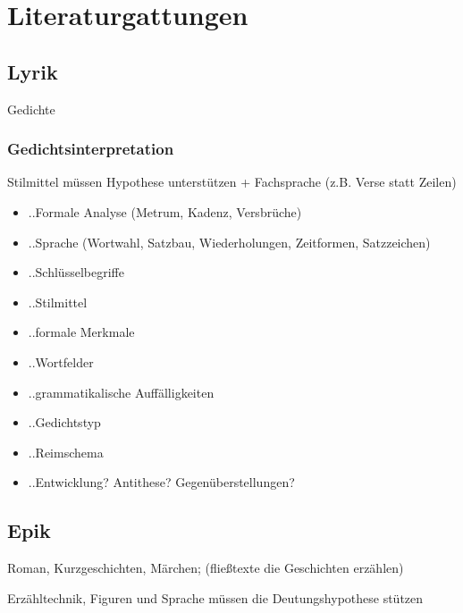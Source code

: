 
\section{Literaturgattungen}


\subsection{Lyrik}

 Gedichte


\subsubsection{Gedichtsinterpretation}

 Stilmittel müssen Hypothese unterstützen + Fachsprache (z.B. Verse statt Zeilen)

\begin{itemize}
    \item ..Formale Analyse (Metrum, Kadenz, Versbrüche)
    \item ..Sprache (Wortwahl, Satzbau, Wiederholungen, Zeitformen, Satzzeichen)
    \item ..Schlüsselbegriffe 
    \item ..Stilmittel
    \item ..formale Merkmale
    \item ..Wortfelder
    \item ..grammatikalische Auffälligkeiten
    \item ..Gedichtstyp
    \item ..Reimschema
    \item ..Entwicklung? Antithese? Gegenüberstellungen?
\end{itemize}


\subsection{Epik}

 Roman, Kurzgeschichten, Märchen; (fließtexte die Geschichten erzählen)

 Erzähltechnik, Figuren und Sprache müssen die Deutungshypothese stützen

